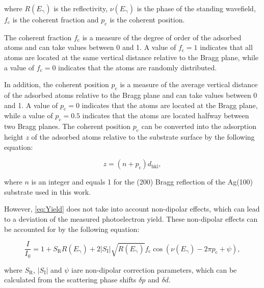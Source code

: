 where $R(E_\mathrm{\gamma})$ is the reflectivity, $\nu(E_\mathrm{\gamma})$ is the phase of the standing wavefield, $f_\mathrm{c}$ is the coherent fraction and $p_\mathrm{c}$ is the coherent position.

The coherent fraction $f_\mathrm{c}$ is a measure of the degree of order of the adsorbed atoms and can take values between 0 and 1. A value of $f_\mathrm{c}=1$ indicates that all atoms are located at the same vertical distance relative to the Bragg plane, while a value of $f_\mathrm{c}=0$ indicates that the atoms are randomly distributed.

In addition, the coherent position $p_\mathrm{c}$ is a measure of the average vertical distance of the adsorbed atoms relative to the Bragg plane and can take values between 0 and 1. A value of $p_\mathrm{c}=0$ indicates that the atoms are located at the Bragg plane, while a value of $p_\mathrm{c}=0.5$ indicates that the atoms are located halfway between two Bragg planes. The coherent position $p_\mathrm{c}$ can be converted into the adsorption height $z$ of the adsorbed atoms relative to the substrate surface by the following equation:

\begin{equation}
	\label{eq:NIXSW-height}
	z = (n + p_\mathrm{c}) d_\mathrm{hkl},
\end{equation}

where $n$ is an integer and equals 1 for the (200) Bragg reflection of the Ag(100) substrate used in this work.

However, \autoref{eq:Yield} does not take into account non-dipolar effects, which can lead to a deviation of the measured photoelectron yield. These non-dipolar effects can be accounted for by the following equation:

\begin{equation}
	\label{eq:YieldNonDipolar}
	\frac{I}{I_0} = 1 + S_\mathrm{R} R(E_\mathrm{\gamma}) + 2 |S_\mathrm{I}| \sqrt{R(E_\mathrm{\gamma})} f_\mathrm{c} \cos(\nu(E_\mathrm{\gamma}) - 2\pi p_\mathrm{c} + \psi),
\end{equation}

where $S_\mathrm{R}$, $|S_\mathrm{I}|$ and $\psi$ iare non-dipolar correction parameters, which can be calculated from the scattering phase shifts $\delta p$ and $\delta d$.\autocite{Bocquet2019,Jablonski2010}


\cleardoublepage